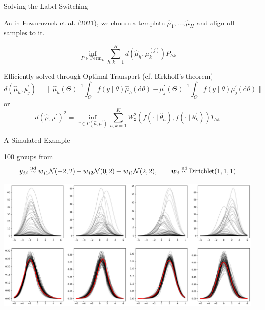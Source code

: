 \documentclass[10.5pt, aspectratio=169]{beamer} %
\newcommand{\iid}{\stackrel{\mbox{\scriptsize iid}}{\sim}}
\newcommand{\dd}{\mathrm d}
\begin{document}
\begin{frame}{Solving the Label-Switching}

As in Poworoznek et al. (2021), we choose a template $\hat \mu_1, \ldots, \hat \mu_H$ and align all samples to it.

\pause
\[
	\inf_{P \in \text{Perm}_H} \sum_{h, k=1}^H d(\hat \mu_h, \mu^{(j)}_k) P_{hk}
\]

\pause
Efficiently solved through Optimal Transport (cf. Birkhoff's theorem)
\pause
\[
	d(\hat \mu_h, \mu^\prime_j) = \Big \|  \hat \mu_h(\Theta)^{-1} \int_\Theta f(y \mid \theta) \hat \mu_h(\dd \theta)  - \mu^\prime_j(\Theta)^{-1} \int_\Theta f(y \mid \theta) \mu^\prime_j(\dd \theta) \Big\|
\]
\pause
or
\[
	d(\hat \mu, \mu^\prime)^2 = \inf_{T \in \Gamma(\hat \mu, \mu^\prime)} \sum_{h, k=1}^K W^2_2(f(\cdot \mid \hat \theta_h), f(\cdot \mid \theta^\prime_k))  T_{hk}
\]

\end{frame}


\begin{frame}{A Simulated Example}

100 groups from
\[
	y_{j, i} \iid  w_{j1} \calN(-2, 2) +  w_{j2} \calN(0, 2) +  w_{j1} \calN(2, 2), \qquad \bm w_j  \iid \mbox{Dirichlet}(1, 1, 1)
\]

\centering
\includegraphics[width=0.7\linewidth]{simu_mgp_latent_dens}


\end{frame}
\end{document}
